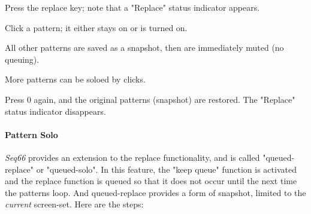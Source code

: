    \begin{enumber}
      \item Press the replace key; note that a "Replace" status
         indicator appears.
      \item Click a pattern; it either stays on or is turned on.
      \item All other patterns are saved as a snapshot, then are immediately
          muted (no queuing).
      \item More patterns can be soloed by clicks.
      \item Press 0 again, and the original patterns (snapshot) are restored.
          The "Replace" status indicator disappears.
   \end{enumber}

\paragraph{Pattern Solo}
\label{paragraph:patterns_pattern_solo}

   \textsl{Seq66} provides an extension to the replace functionality,
   and is called "queued-replace" or "queued-solo".
   In this feature, the "keep queue" function is activated and the
   replace function is queued so that it does not occur until the next
   time the patterns loop.
   And queued-replace provides a form of snapshot, limited to the
   \textsl{current} screen-set.
   Here are the steps:


